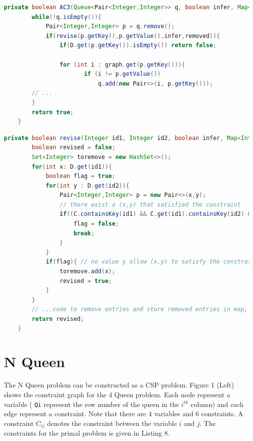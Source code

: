 \documentclass[9.5pt]{extarticle}
\begin{document}
\begin{lstlisting}[language=java,caption={AC3}]
	private boolean AC3(Queue<Pair<Integer,Integer>> q, boolean infer, Map<Integer, Set<Integer>> removed){
        while(!q.isEmpty()){
            Pair<Integer,Integer> p = q.remove();
            if(revise(p.getKey(),p.getValue(),infer,removed)){
                if(D.get(p.getKey()).isEmpty()) return false;
               
                for (int i : graph.get(p.getKey())){
                       if (i != p.getValue()) 
                           q.add(new Pair<>(i, p.getKey()));
        // ...
        }
        return true;
    }
\end{lstlisting} 

\begin{lstlisting}[language=java,caption={revise}]
    private boolean revise(Integer id1, Integer id2, boolean infer, Map<Integer, Set<Integer>> removed) {
        boolean revised = false;
        Set<Integer> toremove = new HashSet<>();
        for(int x: D.get(id1)){
            boolean flag = true;
            for(int y : D.get(id2)){
                Pair<Integer,Integer> p = new Pair<>(x,y);
                // there exist a (x,y) that satisfied the constraint
                if((C.containsKey(id1) && C.get(id1).containsKey(id2) && C.get(id1).get(id2).contains(p))){
                    flag = false;
                    break;
                }
            }
            if(flag){ // no value y allow (x,y) to satisfy the constraint
                toremove.add(x);
                revised = true;
            }
        }
        // ...code to remove entries and store removed entries in map, refer to Java file for details
        return revised;
    }
\end{lstlisting} 



\section{N Queen}

The N Queen problem can be constructed as a CSP problem. Figure 1 (Left) shows the constraint graph for the 4 Queen problem. Each node represent a variable ( \verb`Qi` represent the row number of the queen in the $i^{th}$ column) and each edge represent a constraint. Note that there are 4 variables and 6 constraints. A constraint $C_{ij}$ denotes the constraint between the variable $i$ and $j$. The constraints for the primal problem is given in Listing 8.\\
\end{document}
